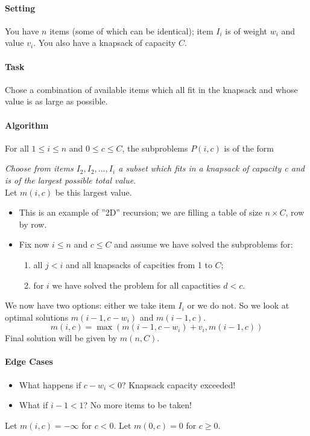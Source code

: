 \paragraph{Setting}
You have \(n\) items (some of which can be identical); item \(I_i\) is of weight \(w_i\) and value \(v_i\). You also have a knapsack of capacity \(C\).

\paragraph{Task}
Chose a combination of available items which all fit in the knapsack and whose value is as large as possible. 

\paragraph{Algorithm}
For all \(1 \leq i \leq n\) and \(0 \leq c \leq C\), the subproblems \(P(i,c)\) is of the form

\textit{Choose from items \(I_2, I_2, \dots, I_i\) a subset which fits in a knapsack of capacity c and is of the largest possible total value.} \\
Let \(m(i,c)\) be this largest value.
\begin{itemize}
    \item This is an example of ''2D'' recursion; we are filling a table of size \(n \times C\), row by row.
    \item Fix now \(i \leq n\) and \(c \leq C\) and assume we have solved the subproblems for:
    \begin{enumerate}
        \item all \(j < i\) and all knapsacks of capcities from 1 to \(C\);
        \item for \(i\) we have solved the problem for all capactities \(d < c\).
    \end{enumerate}
\end{itemize}

We now have two options: either we take item \(I_i\) or we do not. So we look at optimal solutions \(m(i-1, c-w_i)\) and \(m(i - 1, c)\).
\[m(i,c) = \max(m(i-1,c-w_i) + v_i, m(i-1,c))\]
Final solution will be given by \(m(n,C)\).

\paragraph{Edge Cases}
\begin{itemize}
    \item What happens if \(c - w_i < 0\)? Knapsack capacity exceeded!
    \item What if \(i - 1 < 1\)? No more items to be taken!
\end{itemize}
Let \(m(i,c) = -\infty\) for \(c < 0\). \hspace{1cm} Let \(m(0, c) = 0\) for \(c \geq 0\).

